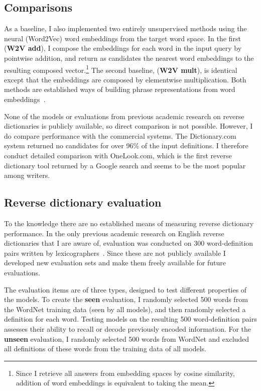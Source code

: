 \subsection{Comparisons}

As a baseline, I also implemented two entirely unsupervised methods using the neural (Word2Vec) word embeddings from the target word space. In the first ({\bf W2V add}), I compose the embeddings for each word in the input query by pointwise addition, and return as candidates the nearest word embeddings to the resulting composed vector.\footnote{Since I retrieve all answers from embedding spaces by cosine similarity, addition of word embeddings is equivalent to taking the mean.} The second baseline, ({\bf W2V mult}), is identical except that the embeddings are composed by elementwise multiplication. Both methods are established ways of building phrase representations from word embeddings~\citep{mitchell2010composition}.

None of the models or evaluations from previous academic research on reverse dictionaries is publicly available, so direct comparison is not possible. However, I do compare performance with the commercial systems. The Dictionary.com system returned no candidates for over 96\% of the input definitions. I therefore conduct detailed comparison with OneLook.com, which is the first reverse dictionary tool returned by a Google search and seems to be the most popular among writers. 

\subsection{Reverse dictionary evaluation}

To the knowledge there are no established means of measuring reverse dictionary performance. In the only previous academic research on English reverse dictionaries that I are aware of, evaluation was conducted on 300 word-definition pairs written by lexicographers~\citep{shaw2013building}. Since these are not publicly available I developed new evaluation sets and make them freely available for future evaluations.  

The evaluation items are of three types, designed to test different properties of the models. To create the {\bf seen} evaluation, I randomly selected 500 words from the WordNet training data (seen by all models), and then randomly selected a definition for each word. Testing models on the resulting 500 word-definition pairs assesses their ability to recall or decode previously encoded information. For the {\bf unseen} evaluation, I randomly selected 500 words from WordNet and excluded all definitions of these words from the training data of all models. 

